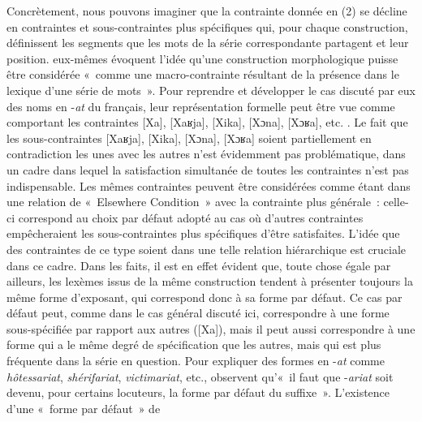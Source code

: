 \documentclass[output=paper]{langsci/langscibook}
\begin{document}
\largerpage
Concrètement, nous pouvons imaginer que la contrainte donnée en (2) se
décline en contraintes et sous-contraintes plus spécifiques qui, pour
chaque cons\-truction, définissent les segments que les mots de la série
correspondante partagent et leur position. %
\citet[54]{Plenat-Roche2014}
eux-mêmes évoquent l'idée qu'une construction morphologique puisse être
considérée «~comme une macro-con\-trainte résultant de la présence dans le
lexique d'une série de mots~». Pour reprendre et développer le cas
discuté par eux des noms en -\emph{at} du français, leur représentation
formelle peut être vue comme comportant les contraintes {[}Xa{]},
{[}Xaʁja{]}, {[}Xika{]}, {[}Xɔna{]}, {[}Xɔʁa{]}, etc. %
\citep[cf. la liste donnée par][54]{Plenat-Roche2014}%
%
. Le fait que les sous-contraintes
{[}Xaʁja{]}, {[}Xika{]}, {[}Xɔna{]}, {[}Xɔʁa{]} soient partiellement en
contradiction les unes avec les autres n'est évidemment pas
problématique, dans un cadre dans lequel la satisfaction simultanée de
toutes les contraintes n'est pas indispensable. Les mêmes contraintes
peuvent être considérées comme étant dans une relation de «~Elsewhere
Condition~» avec la contrainte plus générale~: celle-ci correspond au
choix par défaut adopté au cas où d'autres contraintes empêcheraient les
sous-contraintes plus spécifiques d'être satisfaites. L'idée que des
contraintes de ce type soient dans une telle relation hiérarchique est
cruciale dans ce cadre. Dans les faits, il est en effet évident que,
toute chose égale par ailleurs, les lexèmes issus de la même
construction tendent à présenter toujours la même forme d'exposant, qui
correspond donc à sa forme par défaut. Ce cas par défaut peut, comme
dans le cas général discuté ici, correspondre à une forme sous-spécifiée
par rapport aux autres ({[}Xa{]}), mais il peut aussi correspondre à une
forme qui a le même degré de spécification que les autres, mais qui est
plus fréquente dans la série en question. Pour expliquer des formes en
-\emph{at} comme \emph{hôtessariat}, \emph{shérifariat},
\emph{victimariat}, etc., %
\citet[71]{Plenat-Roche2014} %
%
observent qu'«~il
faut que -\emph{ariat} soit devenu, pour certains locuteurs, la forme
par défaut du suffixe~». L'existence d'une «~forme par défaut~» de
\end{document}
